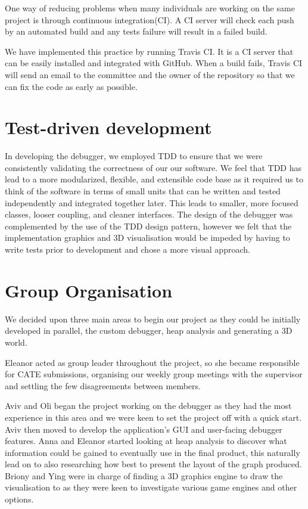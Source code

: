 \documentclass[11pt, a4paper]{report}
\begin{document}
One way of reducing problems when many individuals are working on the same project is through continuous integration(CI). A CI server will check each push by an automated build and any tests failure will result in a failed build.

We have implemented this practice by running Travis CI. It is a CI server that can be easily installed and integrated with GitHub. When a build fails, Travis CI will send an email to the committee and the owner of the repository so that we can fix the code as early as possible.

\section{Test-driven development}

In developing the debugger, we employed TDD to ensure that we were consistently validating the correctness of our our software. We feel that TDD has lead to a more modularized, flexible, and extensible code base as it required us to think of the software in terms of small units that can be written and tested independently and integrated together later. This leads to smaller, more focused classes, looser coupling, and cleaner interfaces. The design of the debugger was complemented by the use of the TDD design pattern, however we felt that the implementation graphics and 3D visualisation would be impeded by having to write tests prior to development and chose a more visual approach. 

\section{Group Organisation}

We decided upon three main areas to begin our project as they could be initially developed in parallel, the custom debugger, heap analysis and generating a 3D world.

Eleanor acted as group leader throughout the project, so she became responsible for CATE submissions, organising our weekly group meetings with the supervisor and settling the few disagreements between members.

Aviv and Oli began the project working on the debugger as they had the most experience in this area and we were keen to set the project off with a quick start. Aviv then moved to develop the application's GUI and user-facing debugger features. Anna and Eleanor started looking at heap analysis to discover what information could be gained to eventually use in the final product, this naturally lead on to also researching how best to present the layout of the graph produced. Briony and Ying were in charge of finding a 3D graphics engine to draw the visualisation to as they were keen to investigate various game engines and other options.
 
\end{document}
